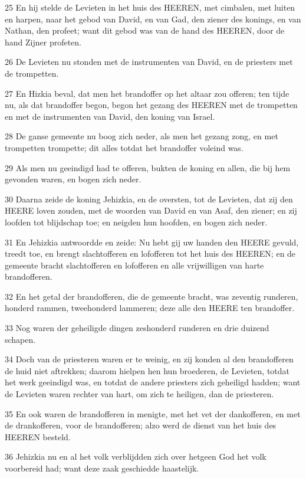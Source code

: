 \par 25 En hij stelde de Levieten in het huis des HEEREN, met cimbalen, met luiten en harpen, naar het gebod van David, en van Gad, den ziener des konings, en van Nathan, den profeet; want dit gebod was van de hand des HEEREN, door de hand Zijner profeten.
\par 26 De Levieten nu stonden met de instrumenten van David, en de priesters met de trompetten.
\par 27 En Hizkia beval, dat men het brandoffer op het altaar zou offeren; ten tijde nu, als dat brandoffer begon, begon het gezang des HEEREN met de trompetten en met de instrumenten van David, den koning van Israel.
\par 28 De ganse gemeente nu boog zich neder, als men het gezang zong, en met trompetten trompette; dit alles totdat het brandoffer voleind was.
\par 29 Als men nu geeindigd had te offeren, bukten de koning en allen, die bij hem gevonden waren, en bogen zich neder.
\par 30 Daarna zeide de koning Jehizkia, en de oversten, tot de Levieten, dat zij den HEERE loven zouden, met de woorden van David en van Asaf, den ziener; en zij loofden tot blijdschap toe; en neigden hun hoofden, en bogen zich neder.
\par 31 En Jehizkia antwoordde en zeide: Nu hebt gij uw handen den HEERE gevuld, treedt toe, en brengt slachtofferen en lofofferen tot het huis des HEEREN; en de gemeente bracht slachtofferen en lofofferen en alle vrijwilligen van harte brandofferen.
\par 32 En het getal der brandofferen, die de gemeente bracht, was zeventig runderen, honderd rammen, tweehonderd lammeren; deze alle den HEERE ten brandoffer.
\par 33 Nog waren der geheiligde dingen zeshonderd runderen en drie duizend schapen.
\par 34 Doch van de priesteren waren er te weinig, en zij konden al den brandofferen de huid niet aftrekken; daarom hielpen hen hun broederen, de Levieten, totdat het werk geeindigd was, en totdat de andere priesters zich geheiligd hadden; want de Levieten waren rechter van hart, om zich te heiligen, dan de priesteren.
\par 35 En ook waren de brandofferen in menigte, met het vet der dankofferen, en met de drankofferen, voor de brandofferen; alzo werd de dienst van het huis des HEEREN besteld.
\par 36 Jehizkia nu en al het volk verblijdden zich over hetgeen God het volk voorbereid had; want deze zaak geschiedde haastelijk.

